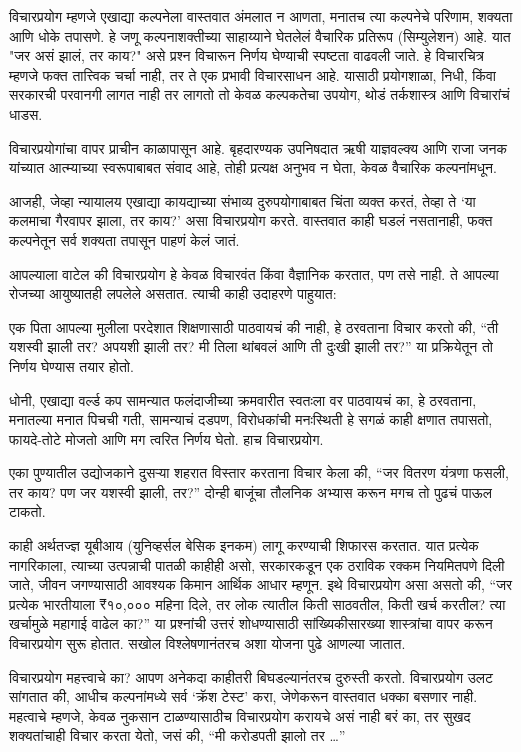 विचारप्रयोग म्हणजे एखाद्या कल्पनेला वास्तवात अंमलात न आणता, मनातच त्या कल्पनेचे परिणाम, शक्यता आणि धोके तपासणे. हे जणू कल्पनाशक्तीच्या साहाय्याने घेतलेलं वैचारिक प्रतिरूप (सिम्युलेशन) आहे. यात "जर असं झालं, तर काय?" असे प्रश्न विचारून निर्णय घेण्याची स्पष्टता वाढवली जाते. हे विचारचित्र म्हणजे फक्त तात्त्विक चर्चा नाही, तर ते एक प्रभावी विचारसाधन आहे. यासाठी प्रयोगशाळा, निधी, किंवा सरकारची परवानगी लागत नाही तर लागतो तो केवळ कल्पकतेचा उपयोग, थोडं तर्कशास्त्र आणि विचारांचं धाडस.

विचारप्रयोगांचा वापर प्राचीन काळापासून आहे. बृहदारण्यक उपनिषदात ऋषी याज्ञवल्क्य आणि राजा जनक यांच्यात आत्म्याच्या स्वरूपाबाबत संवाद आहे, तोही प्रत्यक्ष अनुभव न घेता, केवळ वैचारिक कल्पनांमधून.

आजही, जेव्हा न्यायालय एखाद्या कायद्याच्या संभाव्य दुरुपयोगाबाबत चिंता व्यक्त करतं, तेव्हा ते ‘या कलमाचा गैरवापर झाला, तर काय?’ असा विचारप्रयोग करते. वास्तवात काही घडलं नसतानाही, फक्त कल्पनेतून सर्व शक्यता तपासून पाहणं केलं जातं. 

आपल्याला वाटेल की विचारप्रयोग हे केवळ विचारवंत किंवा वैज्ञानिक करतात, पण तसे नाही. ते आपल्या रोजच्या आयुष्यातही लपलेले असतात. त्याची काही उदाहरणे पाहुयात:

एक पिता आपल्या मुलीला परदेशात शिक्षणासाठी पाठवायचं की नाही, हे ठरवताना विचार करतो की, “ती यशस्वी झाली तर? अपयशी झाली तर? मी तिला थांबवलं आणि ती दुःखी झाली तर?” या प्रक्रियेतून तो निर्णय घेण्यास तयार होतो.

धोनी, एखाद्या वर्ल्ड कप सामन्यात फलंदाजीच्या क्रमवारीत स्वतःला वर पाठवायचं का, हे ठरवताना, मनातल्या मनात पिचची गती, सामन्याचं दडपण, विरोधकांची मनःस्थिती हे सगळं काही क्षणात तपासतो, फायदे-तोटे मोजतो आणि मग त्वरित निर्णय घेतो. हाच विचारप्रयोग.

एका पुण्यातील उद्योजकाने दुसऱ्या शहरात विस्तार करताना विचार केला की, “जर वितरण यंत्रणा फसली, तर काय? पण जर यशस्वी झाली, तर?” दोन्ही बाजूंचा तौलनिक अभ्यास करून मगच तो पुढचं पाऊल टाकतो.

काही अर्थतज्ज्ञ यूबीआय (युनिव्हर्सल बेसिक इनकम) लागू करण्याची शिफारस करतात. यात प्रत्येक नागरिकाला, त्याच्या उत्पन्नाची पातळी काहीही असो, सरकारकडून एक ठराविक रक्कम नियमितपणे दिली जाते, जीवन जगण्यासाठी आवश्यक किमान आर्थिक आधार म्हणून. इथे विचारप्रयोग असा असतो की, “जर प्रत्येक भारतीयाला ₹१०,००० महिना दिले, तर लोक त्यातील किती साठवतील, किती खर्च करतील? त्या खर्चामुळे महागाई वाढेल का?” या प्रश्नांची उत्तरं शोधण्यासाठी सांख्यिकीसारख्या शास्त्रांचा वापर करून विचारप्रयोग सुरू होतात. सखोल विश्लेषणानंतरच अशा योजना पुढे आणल्या जातात.

विचारप्रयोग महत्त्वाचे का? आपण अनेकदा काहीतरी बिघडल्यानंतरच दुरुस्ती करतो. विचारप्रयोग उलट सांगतात की, आधीच कल्पनांमध्ये सर्व ‘क्रॅश टेस्ट’ करा, जेणेकरून वास्तवात धक्का बसणार नाही. महत्वाचे म्हणजे, केवळ नुकसान टाळण्यासाठीच विचारप्रयोग करायचे असं नाही बरं  का, तर सुखद शक्यतांचाही विचार करता येतो, जसं की, “मी करोडपती झालो तर …”

